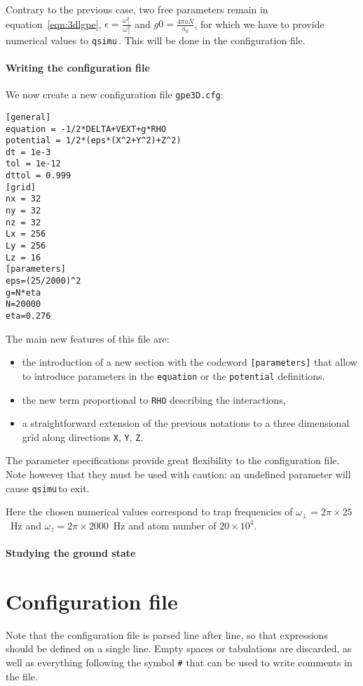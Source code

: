 \documentclass[12pt,a4paper]{report}
\newcommand{\qsimu}{\texttt{qsimu}\,}
\begin{document}
Contrary to the previous case, two free parameters remain in equation~\eqref{eqn:3dlgpe}, $\epsilon=\frac{\omega_\perp^2}{\omega_z^2}$ and $g0=\frac{4\pi aN}{a_0}$, for which we have to provide numerical values to \qsimu.
This will be done in the configuration file.

\subsubsection{Writing the configuration file}
We now create a new configuration file \texttt{gpe3D.cfg}:
\begin{verbatim}
[general]
equation = -1/2*DELTA+VEXT+g*RHO
potential = 1/2*(eps*(X^2+Y^2)+Z^2)
dt = 1e-3
tol = 1e-12
dttol = 0.999
[grid]
nx = 32
ny = 32
nz = 32
Lx = 256
Ly = 256
Lz = 16
[parameters]
eps=(25/2000)^2
g=N*eta
N=20000
eta=0.276
\end{verbatim}
The main new features of this file are:
\begin{itemize}
\item the introduction of a new section with the codeword \texttt{[parameters]} that allow to introduce parameters in the \texttt{equation} or the \texttt{potential} definitions.
\item the new term proportional to \texttt{RHO} describing the interactions,
\item a straightforward extension of the previous notations to a three dimensional grid along directions \texttt{X}, \texttt{Y}, \texttt{Z}.
\end{itemize}
The parameter specifications provide great flexibility to the configuration file.
Note however that they must be used with caution: an undefined parameter will cause \qsimu to exit.

Here the chosen numerical values correspond to trap frequencies of $\omega_\perp=2\pi\times25$~Hz and $\omega_z=2\pi\times2000$~Hz and atom number of $20\times10^4$.

\subsubsection{Studying the ground state}

\chapter{Configuration file}
Note that the configuration file is parsed line after line, so that expressions should be defined on a single line. Empty spaces or tabulations are discarded, as well as everything following the symbol \texttt{\#} that can be used to write comments in the file.
\end{document}
